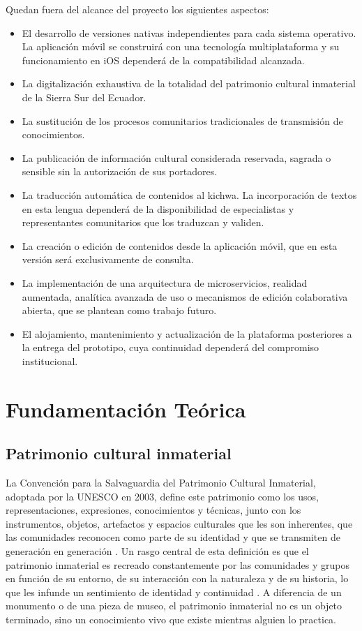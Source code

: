 Quedan fuera del alcance del proyecto los siguientes aspectos:

\begin{itemize}
  \item El desarrollo de versiones nativas independientes para cada sistema operativo. La aplicación móvil se construirá con una tecnología multiplataforma y su funcionamiento en iOS dependerá de la compatibilidad alcanzada.
  \item La digitalización exhaustiva de la totalidad del patrimonio cultural inmaterial de la Sierra Sur del Ecuador.
  \item La sustitución de los procesos comunitarios tradicionales de transmisión de conocimientos.
  \item La publicación de información cultural considerada reservada, sagrada o sensible sin la autorización de sus portadores.
  \item La traducción automática de contenidos al kichwa. La incorporación de textos en esta lengua dependerá de la disponibilidad de especialistas y representantes comunitarios que los traduzcan y validen.
  \item La creación o edición de contenidos desde la aplicación móvil, que en esta versión será exclusivamente de consulta.
  \item La implementación de una arquitectura de microservicios, realidad aumentada, analítica avanzada de uso o mecanismos de edición colaborativa abierta, que se plantean como trabajo futuro.
  \item El alojamiento, mantenimiento y actualización de la plataforma posteriores a la entrega del prototipo, cuya continuidad dependerá del compromiso institucional.
\end{itemize}

\section{Fundamentación Teórica}

\subsection{Patrimonio cultural inmaterial}
La Convención para la Salvaguardia del Patrimonio Cultural Inmaterial, adoptada por la UNESCO en 2003, define este patrimonio como los usos, representaciones, expresiones, conocimientos y técnicas, junto con los instrumentos, objetos, artefactos y espacios culturales que les son inherentes, que las comunidades reconocen como parte de su identidad y que se transmiten de generación en generación \cite{unesco2003convencion}. Un rasgo central de esta definición es que el patrimonio inmaterial es recreado constantemente por las comunidades y grupos en función de su entorno, de su interacción con la naturaleza y de su historia, lo que les infunde un sentimiento de identidad y continuidad \cite{unesco2003convencion}. A diferencia de un monumento o de una pieza de museo, el patrimonio inmaterial no es un objeto terminado, sino un conocimiento vivo que existe mientras alguien lo practica.

